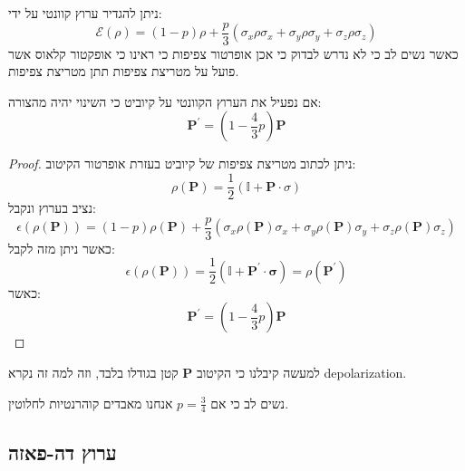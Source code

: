 \documentclass{tstextbook}
\begin{document}
\begin{corollary}
ניתן להגדיר ערוץ קוונטי על ידי:
$$\mathcal{E} \left(\rho\right)=\left(1-p\right)\rho+\frac{p}{3}\left(\sigma_{x}\rho\sigma_{x}+\sigma_{y}\rho\sigma_{y}+\sigma_{z}\rho\sigma_{z}\right)$$
כאשר נשים לב כי לא נדרש לבדוק כי אכן אופרטור צפיפות כי ראינו כי אופקטור קלאוס אשר פועל על מטריצת צפיפות תתן מטריצת צפיפות.

\end{corollary}
\begin{proposition}
אם נפעיל את הערוץ הקוונטי על קיוביט כי השינוי יהיה מהצורה:
$$\mathbf{P}^{\prime}=\left(1-{\frac{4}{3}}p\right)\mathbf{P}$$

\end{proposition}
\begin{proof}
ניתן לכתוב מטריצת צפיפות של קיוביט בעזרת אופרטור הקיטוב:
$$\rho\left(\mathbf{P}\right)={\frac{1}{2}}\left(\mathbb{I}+\mathbf{P}\cdot\sigma\right)$$
נציב בערוץ ונקבל:
$$\epsilon\left(\rho\left(\mathbf{P}\right)\right)=\left(1-p\right)\rho\left(\mathbf{P}\right)+{\frac{p}{3}}\left(\sigma_{x}\rho\left(\mathbf{P}\right)\sigma_{x}+\sigma_{y}\rho\left(\mathbf{P}\right)\sigma_{y}+\sigma_{z}\rho\left(\mathbf{P}\right)\sigma_{z}\right)$$
כאשר ניתן מזה לקבל:
$$\epsilon\left(\rho\left(\mathbf{P}\right)\right)={\frac{1}{2}}\left(\mathbb{I}+\mathbf{P^{\prime}}\cdot\boldsymbol\sigma\right)=\rho\left(\mathbf{P^{\prime}}\right)$$
כאשר:
$$\mathbf{P}^{\prime}=\left(1-{\frac{4}{3}}p\right)\mathbf{P}$$

\end{proof}
\begin{remark}
למעשה קיבלנו כי הקיטוב \(\mathbf{P}\) קטן בגודלו בלבד, וזה למה זה נקרא depolarization.

\end{remark}
\begin{remark}
נשים לב כי אם \(p=\frac{3}{4}\) אנחנו מאבדים קוהרנטיות לחלוטין.

\end{remark}
\subsection{ערוץ דה-פאזה}
\end{document}

